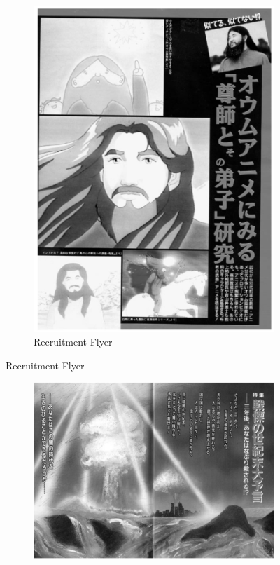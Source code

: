 \documentclass[12pt, letterpaper]{article}
\begin{document}
\begin{figure}[h]
\begin{subfigure}[b]{.4\linewidth}
    \includegraphics[width=\linewidth]{flyer.png}
    \caption{Recruitment Flyer}
  \end{subfigure}
\end{figure}

\begin{figure}[h]
  \caption{Harumagedon}
  \label{fig:harumagedon}
  \centering
  \begin{subfigure}[b]{.9\linewidth}
    \includegraphics[width=\linewidth]{harumagedon.png}
  \end{subfigure}
\end{figure}
\end{document}
